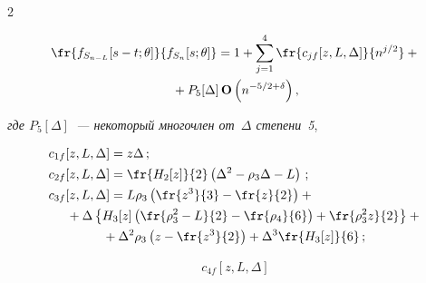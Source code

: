 \begin{multicols}{2}
\pagebreak





\noindent


 \begin{multline}


\fr{f_{S_{n-L}}[s-t;\theta]}{f_{S_n}[s;\theta]}


  =1+\sum\limits_{j=1}^4 \fr{c_{jf}[z,L,\Delta]}{n^{j/2}}+{}\\


  {}+


  P_5[\Delta]\,\Op\left(n^{-5/2+\delta} \right),


 \label{T:6.1-1}


 \end{multline}


  \textit{где $P_5[\Delta]$~--- некоторый многочлен от~$\Delta$ степени~5},


 \begin{align*}


& c_{1f}[z,L,\Delta]=z\Delta\,;\\


& c_{2f}[z,L,\Delta]=\fr{H_2[z]}{2}\left( \Delta^2-\rho_3\Delta-L\right)\,;


\\


 &c_{3f}[z,L,\Delta]


  =L\rho_3\left(\fr{z^3}{3}-\fr{z}{2}\right)+{}\\


&\hspace*{5mm}{}+


   \Delta \left\{ H_3[z] \left(\fr{\rho_3^2-L}{2}-\fr{\rho_4}{6}\right)+


   \fr{\rho_3^2 z}{2}\right\}+{}\\


&\hspace*{15mm}{}   +\Delta^2\rho_3\left(z-\fr{z^3}{2}\right)+


    \Delta^3\fr{H_3[z]}{6}\,;


 \end{align*}





 \vspace*{-12pt}





 \begin{multline*}


  c_{4f}[z,L,\Delta]



\end{multline*}
\end{multicols}
